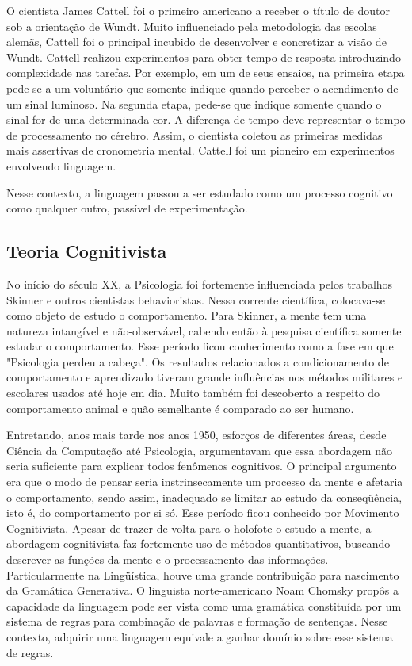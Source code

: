 O cientista James Cattell foi o primeiro americano a receber o título de doutor sob a orientação de Wundt. Muito influenciado pela metodologia das escolas alemãs, Cattell foi o principal incubido de desenvolver e concretizar a visão de Wundt. Cattell realizou experimentos para obter tempo de resposta introduzindo complexidade nas tarefas. Por exemplo, em um de seus ensaios, na primeira etapa pede-se a um voluntário que somente indique quando perceber o acendimento de um sinal luminoso. Na segunda etapa, pede-se que indique somente quando o sinal for de uma determinada cor. A diferença de tempo deve representar o tempo de processamento no cérebro.  Assim, o cientista coletou as primeiras medidas mais assertivas de cronometria mental. Cattell foi um pioneiro em experimentos envolvendo linguagem. 

Nesse contexto, a linguagem passou a ser estudado como um processo cognitivo como qualquer outro, passível de experimentação.

\subsection{Teoria Cognitivista}

No início do século XX, a Psicologia foi fortemente influenciada pelos trabalhos Skinner e outros cientistas behavioristas. Nessa corrente científica, colocava-se como objeto de estudo o comportamento. Para Skinner, a mente tem uma natureza intangível e não-observável, cabendo então à pesquisa científica somente estudar o comportamento. Esse período ficou conhecimento como a fase em que "Psicologia perdeu a cabeça". Os resultados relacionados a condicionamento de comportamento e aprendizado tiveram grande influências nos métodos militares e escolares usados até hoje em dia. Muito também foi descoberto a respeito do comportamento animal e quão semelhante é comparado ao ser humano.

Entretando, anos mais tarde nos anos 1950, esforços de diferentes áreas, desde Ciência da Computação até Psicologia, argumentavam que essa abordagem não seria suficiente para explicar todos fenômenos cognitivos. O principal argumento era que o modo de pensar seria instrinsecamente um processo da mente e afetaria o comportamento, sendo assim, inadequado se limitar ao estudo da conseqüência, isto é, do comportamento por si só. Esse período ficou conhecido por Movimento Cognitivista. Apesar de trazer de volta para o holofote o estudo a mente, a abordagem cognitivista faz fortemente uso de métodos quantitativos, buscando descrever as funções da mente e o processamento das informações. Particularmente na Lingüística, houve uma grande contribuição para nascimento da Gramática Generativa. O linguista norte-americano Noam Chomsky \citep{chomsky65} propôs a capacidade da linguagem pode ser vista como uma gramática constituída por um sistema de regras para combinação de palavras e formação de sentenças. Nesse contexto, adquirir uma linguagem equivale a ganhar domínio sobre esse sistema de regras.






